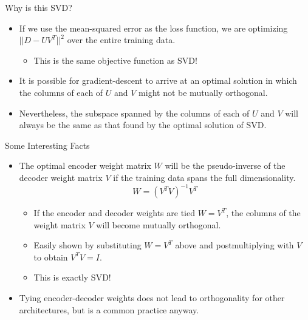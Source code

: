 \begin{frame}{Why is this SVD?}
\begin{itemize}
\item If we use the mean-squared error as the loss function, we are
optimizing $||D -UV^T||^2$ over the entire training data.
\begin{itemize}
\item This is the same objective function as SVD!
\end{itemize}
\item  It is possible for gradient-descent to arrive at an optimal solution in which
 the columns of each of $U$ and $V$ might not be
mutually orthogonal.
\item Nevertheless, the subspace spanned by the columns of each of
$U$ and $V$ will always be the same as that found by the optimal
solution of SVD.
\end{itemize}
\end{frame}


\begin{frame}{Some Interesting Facts}
\begin{itemize}
\item The optimal encoder weight matrix $W$ will be the pseudo-inverse
of the decoder weight matrix  $V$ if the training data spans the
full dimensionality.
\begin{equation*}
W= (V^T V)^{-1} V^T
\end{equation*}
\begin{itemize}
\item If the encoder and decoder weights are tied $W=V^T$, the columns of
the weight matrix $V$ will  become mutually orthogonal.
\item Easily shown by substituting $W=V^T$ above and postmultiplying with
$V$ to obtain $V^TV=I$.
\item This is exactly SVD!
\end{itemize}
\item Tying encoder-decoder weights does not lead to orthogonality for other architectures, but
is a common practice anyway.
\end{itemize}
\end{frame}


